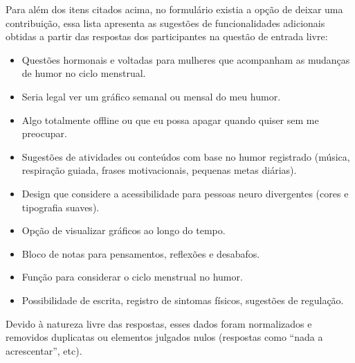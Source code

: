 \FloatBarrier

\newpage
Para além dos itens citados acima, no formulário existia a opção de
deixar uma contribuição, essa lista apresenta as sugestões de
funcionalidades adicionais obtidas a partir das respostas dos
participantes na questão de entrada livre:

\begin{itemize}
  \item Questões hormonais e voltadas para mulheres que acompanham as
  mudanças de humor no ciclo menstrual.
  \item Seria legal ver um gráfico semanal ou mensal do meu humor.
  \item Algo totalmente offline ou que eu possa apagar quando quiser
  sem me preocupar.
  \item Sugestões de atividades ou conteúdos com base no humor
  registrado (música, respiração guiada, frases motivacionais, pequenas metas diárias).
  \item Design que considere a acessibilidade para pessoas neuro
  divergentes (cores e tipografia suaves).
  \item Opção de visualizar gráficos ao longo do tempo.
  \item Bloco de notas para pensamentos, reflexões e desabafos.
  \item Função para considerar o ciclo menstrual no humor.
  \item Possibilidade de escrita, registro de sintomas físicos,
  sugestões de regulação.
\end{itemize}

Devido à natureza livre das respostas, esses dados foram normalizados
e removidos duplicatas ou elementos julgados nulos
(respostas como ``nada a acrescentar'', etc).
